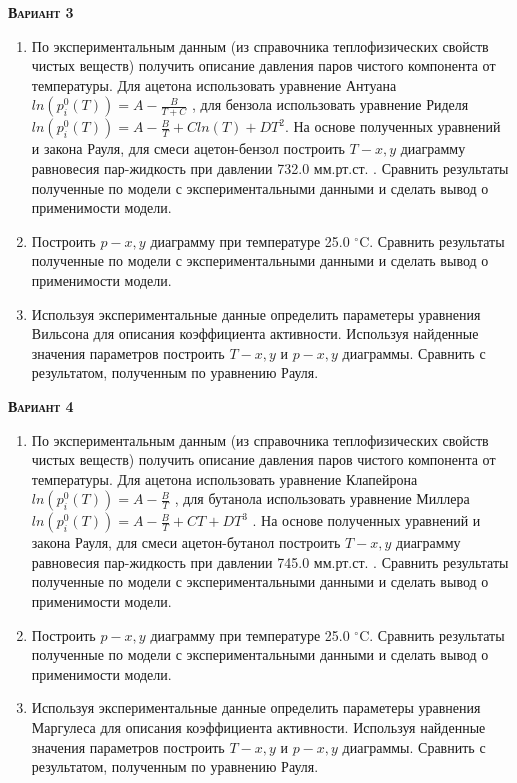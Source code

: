 \textsc{\textbf{Вариант 3}}
\begin{enumerate}
\item По экспериментальным данным (из справочника теплофизических свойств чистых веществ) получить описание давления паров чистого компонента от температуры. Для ацетона использовать уравнение Антуана $ln(p_i^0(T))=A-\frac{B}{T+C}$         , для бензола использовать уравнение Риделя $ln(p_i^0(T))=A-\frac{B}{T}+C ln(T)+DT^2$. На основе полученных уравнений и закона Рауля, для смеси ацетон-бензол построить $T-x,y$ диаграмму равновесия пар-жидкость при давлении  732.0 мм.рт.ст. . Сравнить результаты полученные по модели с экспериментальными данными и сделать вывод о применимости модели.

\item Построить $p-x,y$ диаграмму при температуре   25.0 $^\circ$C. Сравнить результаты полученные по модели с экспериментальными данными и сделать вывод о применимости модели. \item Используя экспериментальные данные определить параметеры уравнения Вильсона     для описания коэффициента активности. Используя найденные значения параметров построить $T-x,y$ и $p-x,y$ диаграммы. Сравнить с результатом, полученным по уравнению Рауля.\end{enumerate}

\textsc{\textbf{Вариант 4}}
\begin{enumerate}
\item По экспериментальным данным (из справочника теплофизических свойств чистых веществ) получить описание давления паров чистого компонента от температуры. Для ацетона использовать уравнение Клапейрона $ln(p_i^0(T))=A-\frac{B}{T}$     , для бутанола использовать уравнение Миллера $ln(p_i^0(T))=A-\frac{B}{T}+C T+DT^3$  . На основе полученных уравнений и закона Рауля, для смеси ацетон-бутанол построить $T-x,y$ диаграмму равновесия пар-жидкость при давлении  745.0 мм.рт.ст. . Сравнить результаты полученные по модели с экспериментальными данными и сделать вывод о применимости модели.

\item Построить $p-x,y$ диаграмму при температуре   25.0 $^\circ$C. Сравнить результаты полученные по модели с экспериментальными данными и сделать вывод о применимости модели. \item Используя экспериментальные данные определить параметеры уравнения Маргулеса   для описания коэффициента активности. Используя найденные значения параметров построить $T-x,y$ и $p-x,y$ диаграммы. Сравнить с результатом, полученным по уравнению Рауля.\end{enumerate}

